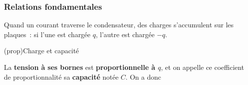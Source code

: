 \documentclass[../../main/main.tex]{subfiles}
\begin{document}
\subsubsection{Relations fondamentales}
Quand un courant traverse le condensateur, des charges s'accumulent sur
les plaques~: si l'une est chargée $q$, l'autre est chargée $-q$.
\begin{tcb*}[label=prop:Ccondens, sidebyside, righthand ratio=.3](prop){Charge et capacité}
	\begin{isd}[righthand ratio=.3, sidebyside align=top]
		La \textbf{tension à ses bornes} est \textbf{proportionnelle à $q$}, et on
		appelle ce coefficient de proportionnalité sa \textbf{capacité} notée $C$.
		On a donc
		\psw{%
			\[\boxed{q = Cu}\]
		}%
		\vspace*{-15pt}
		\tcblower
		\vspace{-15pt}
	\end{isd}
	\tcblower
	\begin{center}
	\end{center}
\end{tcb*}
\end{document}
